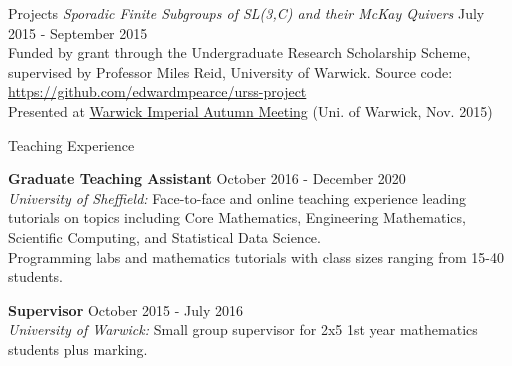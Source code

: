 \documentclass{resume} %
\begin{document}
\begin{rSection}{Projects}
{\em Sporadic Finite Subgroups of SL(3,C) and their McKay Quivers} \hfill July 2015 - September 2015 \\
Funded by grant through the Undergraduate Research Scholarship Scheme, supervised by Professor Miles Reid, University of Warwick. 
Source code: \href{https://github.com/edwardmpearce/urss-project}{https://github.com/edwardmpearce/urss-project} \\
Presented at \href{https://warwick.ac.uk/fac/sci/maths/research/events/2015-16/nonsymposium/wimp/}{Warwick Imperial Autumn Meeting} (Uni. of Warwick, Nov. 2015)

\end{rSection}


\begin{rSection}{Teaching Experience}

{\bf Graduate Teaching Assistant} \hfill October 2016 - December 2020 \\
{\em University of Sheffield:} Face-to-face and online teaching experience leading tutorials on topics including Core Mathematics, Engineering Mathematics, Scientific Computing, and Statistical Data Science. \\
Programming labs and mathematics tutorials with class sizes ranging from 15-40 students.

{\bf Supervisor} \hfill October 2015 - July 2016 \\
{\em University of Warwick:} Small group supervisor for 2x5 1st year mathematics students plus marking. \\


\end{rSection}

\end{document}
